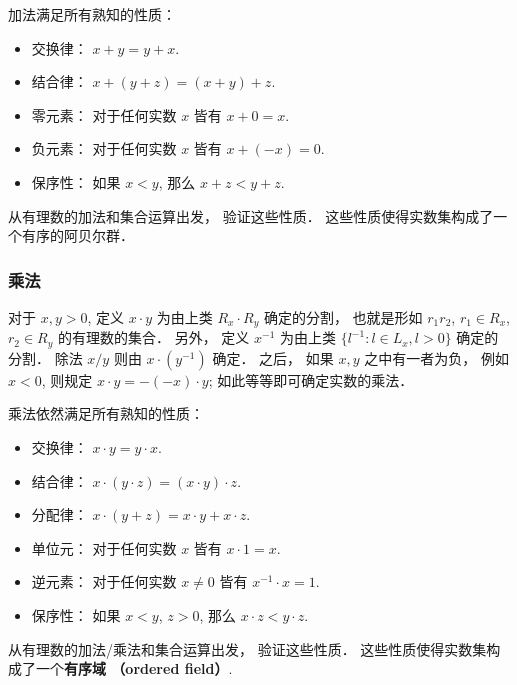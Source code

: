 加法满足所有熟知的性质：

\begin{itemize}
\item 交换律： $x+y=y+x$.
\item 结合律： $x+(y+z)=(x+y)+z$.
\item 零元素： 对于任何实数 $x$ 皆有 $x+0=x$.
\item 负元素： 对于任何实数 $x$ 皆有 $x+(-x)=0$.
\item 保序性： 如果 $x<y$, 那么 $x+z<y+z$.
\end{itemize}

\begin{exercise}{}
从有理数的加法和集合运算出发， 验证这些性质． 这些性质使得实数集构成了一个有序的阿贝尔群．
\end{exercise}

\subsubsection{乘法}

对于 $x,y>0$, 定义 $x\cdot y$ 为由上类 $R_x\cdot R_y$ 确定的分割， 也就是形如 $r_1r_2$, $r_1\in R_x$, $r_2\in R_y$ 的有理数的集合． 另外， 定义 $x^{-1}$ 为由上类 $\{l^{-1}:l\in L_x,l>0\}$ 确定的分割． 除法 $x/y$ 则由 $x\cdot(y^{-1})$ 确定． 之后， 如果 $x,y$ 之中有一者为负， 例如 $x<0$, 则规定 $x\cdot y=-(-x)\cdot y$; 如此等等即可确定实数的乘法． 

乘法依然满足所有熟知的性质：

\begin{itemize}
\item 交换律： $x\cdot y=y\cdot x$.
\item 结合律： $x\cdot (y\cdot z)=(x\cdot y)\cdot z$.
\item 分配律： $x\cdot (y+z)=x\cdot y+x\cdot z$.
\item 单位元： 对于任何实数 $x$ 皆有 $x\cdot 1=x$.
\item 逆元素： 对于任何实数 $x\neq0$ 皆有 $x^{-1}\cdot x=1$.
\item 保序性： 如果 $x<y$, $z>0$, 那么 $x\cdot z<y\cdot z$.
\end{itemize}

\begin{exercise}{}
从有理数的加法/乘法和集合运算出发， 验证这些性质． 这些性质使得实数集构成了一个\textbf{有序域 （ordered field）}.
\end{exercise}
